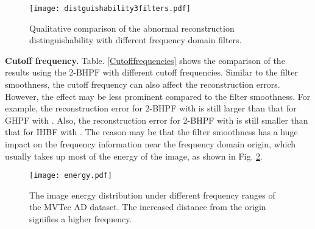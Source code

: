 \documentclass[5p, twocolumn]{elsarticle}[draft]
\begin{document}
\begin{figure}[h]
    \centering
		\texttt{[image: distguishability3filters.pdf]}
	\caption{Qualitative comparison of the abnormal reconstruction distinguishability with different frequency domain filters.}
	\label{distguishability3filters}
\end{figure}

\begin{table}[h]
\caption{Quantitative comparison of the anomaly detection performance with different frequency domain filters. I-AUROC and P-AUROC refer to image-level and pixel-level AUROC respectively. The normal reconstruction errors (Normal errors) are evaluated with MSE in units of 1e-4.}
\end{table}

\textbf{Cutoff frequency.} Table. \ref{Cutofffrequencies} shows the comparison of the results using the 2-BHPF with different cutoff frequencies. Similar to the filter smoothness, the cutoff frequency can also affect the reconstruction errors. However, the effect may be less prominent compared to the filter smoothness. For example, the reconstruction error for 2-BHPF with  is still larger than that for GHPF with . Also, the reconstruction error for 2-BHPF with  is still smaller than that for IHBF with . The reason may be that the filter smoothness has a huge impact on the frequency information near the frequency domain origin, which usually takes up most of the energy of the image, as shown in Fig. \ref{energy}.

\begin{figure}[h]
    \centering
		\texttt{[image: energy.pdf]}
	\caption{The image energy distribution under different frequency ranges of the MVTec AD dataset. The increased distance from the origin signifies a higher frequency.}
	\label{energy}
\end{figure}
\end{document}
